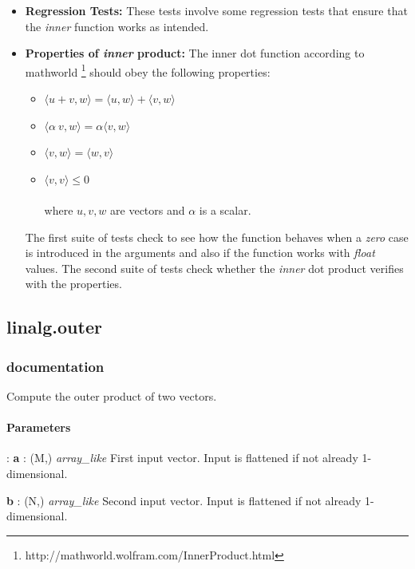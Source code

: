 \documentclass[a4paper,11pt]{article}
\begin{document}
\begin{itemize}
	\item \textbf{Regression Tests:} These tests involve some regression tests that ensure that the \textit{inner} function works as intended.
	
	\item \textbf{Properties of \textit{inner} product:} The inner dot function according to mathworld \footnote{http://mathworld.wolfram.com/InnerProduct.html} should obey the following properties:
	
	\begin{itemize}
		\item[1.] $ \langle u + v,w \rangle = \langle u , w \rangle + \langle v , w \rangle $ 
		\item[2.] $ \langle \alpha~v,w \rangle = \alpha \langle v , w \rangle $
		\item[3.] $ \langle v,w \rangle = \langle w, v \rangle $
		\item[4.] $ \langle v,v \rangle \leq 0 $
		\\
		\\ where $ u, v, w $ are vectors and $ \alpha $ is a scalar.
	\end{itemize}
	
	The first suite of tests check to see how the function behaves when a \emph{zero} case is introduced in the arguments and also if the function works with \emph{float} values. The second suite of tests check whether the \emph{inner} dot product verifies with the properties.
	
	
\end{itemize}

\subsection{linalg.outer}
\subsubsection{documentation}
Compute the outer product of two vectors.

\paragraph{Parameters}:	
\textbf{a} : (M,) \textit{array\_like} First input vector. Input is flattened if not already 1-dimensional.

\textbf{b} : (N,) \textit{array\_like} Second input vector. Input is flattened if not already 1-dimensional.
\end{document}

